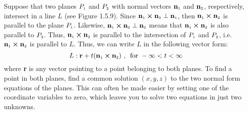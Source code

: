Suppose
that two planes $P_{\scriptscriptstyle 1}$ and $P_{\scriptscriptstyle 2}$ with normal vectors $\textbf{n}_{\scriptscriptstyle 1}$ and $\textbf{n}_{\scriptscriptstyle 2}$,
respectively, intersect in a line $L$ (see Figure 1.5.9). 
Since $\textbf{n}_{\scriptscriptstyle 1} \bm{\times} \textbf{n}_{\scriptscriptstyle 2} \perp
\textbf{n}_{\scriptscriptstyle 1}$, then $\textbf{n}_{\scriptscriptstyle 1} \bm{\times} \textbf{n}_{\scriptscriptstyle 2}$ is parallel to the plane
$P_{\scriptscriptstyle 1}$. 
Likewise, $\textbf{n}_{\scriptscriptstyle 1} \bm{\times} \textbf{n}_{\scriptscriptstyle 2} \perp \textbf{n}_{\scriptscriptstyle 2}$ means
that $\textbf{n}_{\scriptscriptstyle 1} \bm{\times} \textbf{n}_{\scriptscriptstyle 2}$ is also parallel to $P_{\scriptscriptstyle 2}$. 
Thus,
$\textbf{n}_{\scriptscriptstyle 1} \bm{\times} \textbf{n}_{\scriptscriptstyle 2}$ is parallel to the intersection of $P_{\scriptscriptstyle 1}$ and
$P_{\scriptscriptstyle 2}$, i.e. $\textbf{n}_{\scriptscriptstyle 1} \bm{\times} \textbf{n}_{\scriptscriptstyle 2}$ is parallel to $L$. 
Thus, we can
write $L$ in the following vector form:
\begin{equation}
 L: \textbf{r} + t(\textbf{n}_{\scriptscriptstyle 1} \bm{\times} \textbf{n}_{\scriptscriptstyle 2}) \text{~,~~for~} -\infty < t < \infty
\end{equation}
where \textbf{r} is any vector pointing to a point belonging to both planes. To find a point in both planes,
find a common solution $(x,y,z)$ to the two normal form equations of the planes. This can often be made easier
by setting one of the coordinate variables to zero, which leaves you to solve two equations in just two unknowns.

